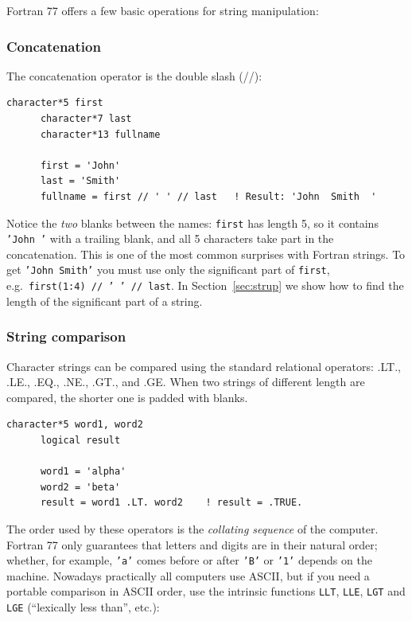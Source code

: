 Fortran 77 offers a few basic operations for string manipulation:

\subsubsection{Concatenation}

The concatenation operator is the double slash (//):

\begin{lstlisting}[style=fortran77]
      character*5 first
      character*7 last
      character*13 fullname
      
      first = 'John'
      last = 'Smith'
      fullname = first // ' ' // last   ! Result: 'John  Smith  '
\end{lstlisting}

Notice the \emph{two} blanks between the names: \texttt{first} has length 5, so it contains \texttt{'John '} with a trailing blank, and all 5 characters take part in the concatenation. This is one of the most common surprises with Fortran strings. To get \texttt{'John Smith'} you must use only the significant part of \texttt{first}, e.g.\ \texttt{first(1:4) // ' ' // last}. In Section~\ref{sec:strup} we show how to find the length of the significant part of a string.

\subsubsection{String comparison}

Character strings can be compared using the standard relational operators: .LT., .LE., .EQ., .NE., .GT., and .GE. When two strings of different length are compared, the shorter one is padded with blanks.

\begin{lstlisting}[style=fortran77]
      character*5 word1, word2
      logical result

      word1 = 'alpha'
      word2 = 'beta'
      result = word1 .LT. word2    ! result = .TRUE.
\end{lstlisting}

The order used by these operators is the \emph{collating sequence} of the computer. Fortran 77 only guarantees that letters and digits are in their natural order; whether, for example, \texttt{'a'} comes before or after \texttt{'B'} or \texttt{'1'} depends on the machine. Nowadays practically all computers use ASCII, but if you need a portable comparison in ASCII order, use the intrinsic functions \texttt{LLT}, \texttt{LLE}, \texttt{LGT} and \texttt{LGE} (``lexically less than'', etc.):

